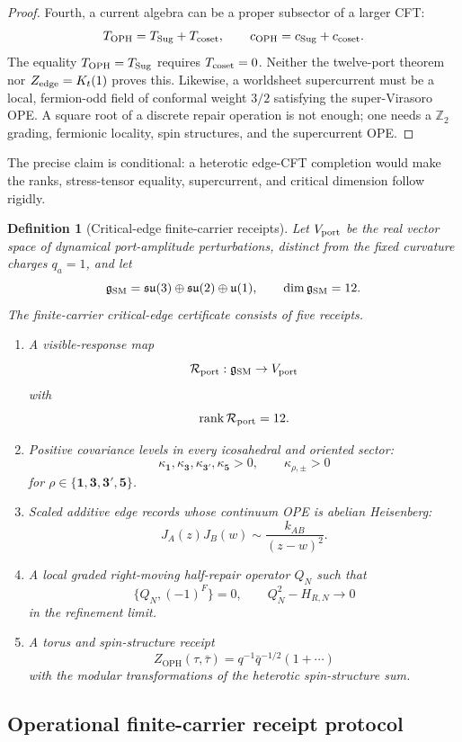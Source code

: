 \documentclass[11pt]{article}
\newtheorem{definition}[theorem]{Definition}
\theoremstyle{remark}
\theoremstyle{plain}
\newcommand{\OPH}{\mathrm{OPH}}
\newcommand{\Z}{\mathbb Z}
\newcommand{\calR}{\mathcal R}
\begin{document}
\begin{proof}
Fourth, a current algebra can be a proper subsector of a larger CFT:
\[
T_{\OPH}=T_{\rm Sug}+T_{\rm coset},
\qquad
c_{\OPH}=c_{\rm Sug}+c_{\rm coset}.
\]
The equality \(T_{\OPH}=T_{\rm Sug}\) requires \(T_{\rm coset}=0\). Neither the twelve-port theorem
nor \(Z_{\rm edge}=K_t(1)\) proves this. Likewise, a worldsheet supercurrent must be a local,
fermion-odd field of conformal weight \(3/2\) satisfying the super-Virasoro OPE. A square root of a
discrete repair operation is not enough; one needs a \(\Z_2\) grading, fermionic locality, spin
structures, and the supercurrent OPE.
\end{proof}

The precise claim is conditional: a heterotic edge-CFT completion would make the ranks,
stress-tensor equality, supercurrent, and critical dimension follow rigidly.

\begin{definition}[Critical-edge finite-carrier receipts]
Let \(V_{\rm port}\) be the real vector space of dynamical port-amplitude perturbations, distinct
from the fixed curvature charges \(q_a=1\), and let
\[
\mathfrak g_{\rm SM}=
\mathfrak{su}(3)\oplus\mathfrak{su}(2)\oplus\mathfrak u(1),
\qquad
\dim\mathfrak g_{\rm SM}=12.
\]
The finite-carrier critical-edge certificate consists of five receipts.
\begin{enumerate}[leftmargin=2em]
\item A visible-response map
\[
\calR_{\rm port}:\mathfrak g_{\rm SM}\to V_{\rm port}
\]
with
\[
\operatorname{rank}\calR_{\rm port}=12.
\]
\item Positive covariance levels in every icosahedral and oriented sector:
\[
\kappa_{\mathbf1},\kappa_{\mathbf3},\kappa_{\mathbf3'},\kappa_{\mathbf5}>0,
\qquad
\kappa_{\rho,\pm}>0
\]
for \(\rho\in\{\mathbf1,\mathbf3,\mathbf3',\mathbf5\}\).
\item Scaled additive edge records whose continuum OPE is abelian Heisenberg:
\[
J_A(z)J_B(w)\sim\frac{k_{AB}}{(z-w)^2}.
\]
\item A local graded right-moving half-repair operator \(Q_N\) such that
\[
\{Q_N,(-1)^F\}=0,
\qquad
Q_N^2-H_{R,N}\to0
\]
in the refinement limit.
\item A torus and spin-structure receipt
\[
Z_{\OPH}(\tau,\bar\tau)=q^{-1}\bar q^{-1/2}(1+\cdots)
\]
with the modular transformations of the heterotic spin-structure sum.
\end{enumerate}
\end{definition}

\subsection{Operational finite-carrier receipt protocol}
\end{document}
